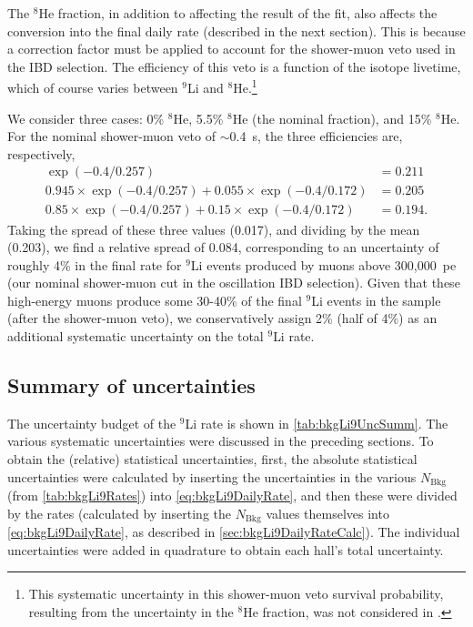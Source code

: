 \documentclass[../thesis.tex]{subfiles}
\begin{document}
The $^8$He fraction, in addition to affecting the result of the fit, also affects the conversion into the final daily rate (described in the next section). This is because a correction factor must be applied to account for the shower-muon veto used in the IBD selection. The efficiency of this veto is a function of the isotope livetime, which of course varies between $^9$Li and $^8$He.\footnote{This systematic uncertainty in this shower-muon veto survival probability, resulting from the uncertainty in the $^8$He fraction, was not considered in \cite{ChrisLi9}.}

We consider three cases: 0\% $^8$He, 5.5\% $^8$He (the nominal fraction), and 15\% $^8$He. For the nominal shower-muon veto of $\sim$0.4~s, the three efficiencies are, respectively,
\begin{align*}
  \exp(-0.4/0.257) &= 0.211 \\
  0.945 \times \exp(-0.4/0.257) + 0.055 \times \exp(-0.4/0.172) &= 0.205 \\
  0.85 \times \exp(-0.4/0.257) + 0.15 \times \exp(-0.4/0.172) &= 0.194.
\end{align*}
Taking the spread of these three values (0.017), and dividing by the mean (0.203), we find a relative spread of 0.084, corresponding to an uncertainty of roughly 4\% in the final rate for $^9$Li events produced by muons above 300,000~pe (our nominal shower-muon cut in the oscillation IBD selection). Given that these high-energy muons produce some 30-40\% of the final $^9$Li events in the sample (after the shower-muon veto), we conservatively assign 2\% (half of 4\%) as an additional systematic uncertainty on the total $^9$Li rate. %

\subsection{Summary of uncertainties}
\label{sec:bkgLi9UncSumm}

The uncertainty budget of the $^9$Li rate is shown in \autoref{tab:bkgLi9UncSumm}. The various systematic uncertainties were discussed in the preceding sections. To obtain the (relative) statistical uncertainties, first, the absolute statistical uncertainties were calculated by inserting the uncertainties in the various $N_{\mathrm{Bkg}}$ (from \autoref{tab:bkgLi9Rates}) into \autoref{eq:bkgLi9DailyRate}, and then these were divided by the rates (calculated by inserting the $N_{\mathrm{Bkg}}$ values themselves into \autoref{eq:bkgLi9DailyRate}, as described in \autoref{sec:bkgLi9DailyRateCalc}). The individual uncertainties were added in quadrature to obtain each hall's total uncertainty.
\end{document}
